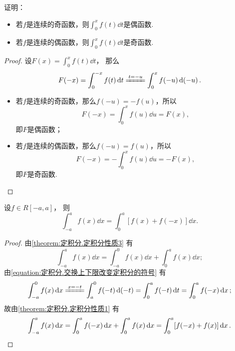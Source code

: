 \begin{example}
证明：\begin{itemize}
	\item 若\(f\)是连续的奇函数，则\(\int_0^x f(t) \dd{t}\)是偶函数.
	\item 若\(f\)是连续的偶函数，则\(\int_0^x f(t) \dd{t}\)是奇函数.
\end{itemize}
\begin{proof}
设\(F(x) = \int_0^x f(t) \dd{t}\)，
那么\[
	F(-x) = \int_0^{-x} f(t) \dd{t}
	\xlongequal{t=-u} \int_0^x f(-u) \dd(-u).
\]
\begin{itemize}
	\item 若\(f\)是连续的奇函数，那么\(f(-u) = -f(u)\)，所以\[
		F(-x) = \int_0^x f(u) \dd{u} = F(x),
	\]
	即\(F\)是偶函数；

	\item 若\(f\)是连续的偶函数，那么\(f(-u) = f(u)\)，所以\[
		F(-x) = -\int_0^x f(u) \dd{u} = -F(x),
	\]
	即\(F\)是奇函数.
	\qedhere
\end{itemize}
\end{proof}
\end{example}

\begin{proposition}\label{theorem:定积分.利用对称性简化计算0}
设\(f \in R[-a,a]\)，
则\begin{equation}
	\int_{-a}^a f(x) \dd{x} = \int_0^a [f(x) + f(-x)] \dd{x}.
\end{equation}
\begin{proof}
由\cref{theorem:定积分.定积分性质3} 有\[
	\int_{-a}^a f(x) \dd{x}
	= \int_{-a}^0 f(x) \dd{x}
	+ \int_0^a f(x) \dd{x};
\]
由\cref{equation:定积分.交换上下限改变定积分的符号} 有\[
	\int_{-a}^0 f(x) \dd{x}
	\xlongequal{x=-t} \int_a^0 f(-t) \dd(-t)
	= \int_0^a f(-t) \dd{t}
	= \int_0^a f(-x) \dd{x};
\]
故由\cref{theorem:定积分.定积分性质1} 有\[
	\int_{-a}^a f(x) \dd{x}
	= \int_0^a f(-x) \dd{x} + \int_0^a f(x) \dd{x}
	= \int_0^a [f(-x) + f(x)] \dd{x}.
	\qedhere
\]
\end{proof}
\end{proposition}

